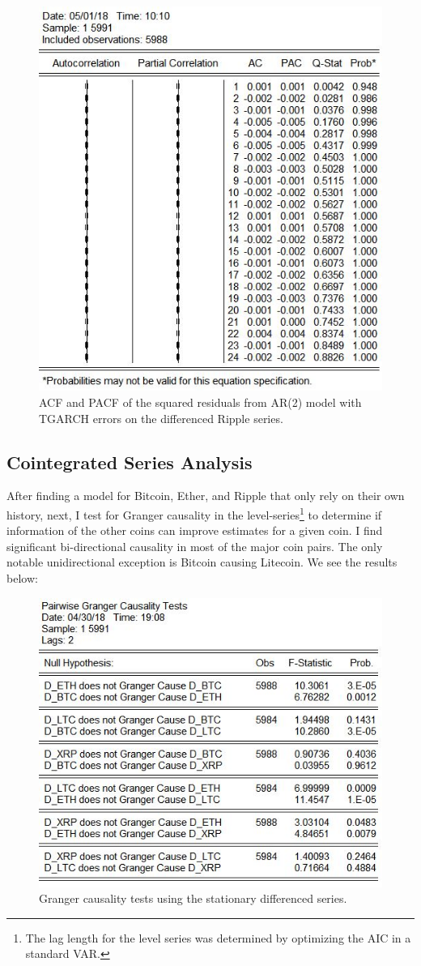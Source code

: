 \documentclass{article}
\begin{document}
	\begin{figure}[H]
		\centering
		\includegraphics[width = .75\textwidth]{xrpTGARCH_residSqCor.jpg}
		\caption{ACF and PACF of the squared residuals from AR(2) model with TGARCH errors on the differenced Ripple series.}
	\end{figure}
	 
	\subsection{Cointegrated Series Analysis}
	After finding a model for Bitcoin, Ether, and Ripple that only rely on their own history, next, I test for Granger causality in the level-series\footnote{The lag length for the level series was determined by optimizing the AIC in a standard VAR.} to determine if information of the other coins can improve estimates for a given coin. I find significant bi-directional causality in most of the major coin pairs. The only notable unidirectional exception is Bitcoin causing Litecoin. We see the results below: 
	
	\begin{figure}[H]
		\centering
		\includegraphics[width = .75\textwidth]{GrangerCausality_levels.jpg}
		\caption{Granger causality tests using the stationary differenced series.}
	\end{figure}
	
\end{document}
